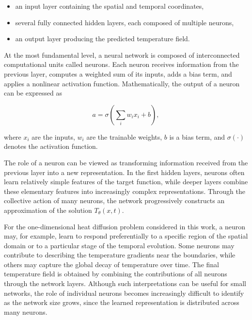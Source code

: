 \begin{itemize}
\item an input layer containing the spatial and temporal coordinates,
\item several fully connected hidden layers, each composed of multiple neurons,
\item an output layer producing the predicted temperature field.
\end{itemize}

At the most fundamental level, a neural network is composed of interconnected computational units called neurons. Each neuron receives information from the previous layer, computes a weighted sum of its inputs, adds a bias term, and applies a nonlinear activation function. Mathematically, the output of a neuron can be expressed as

\begin{equation}
a = \sigma
\left(
\sum_i w_i x_i + b
\right),
\end{equation}

where $x_i$ are the inputs, $w_i$ are the trainable weights, $b$ is a bias term, and $\sigma(\cdot)$ denotes the activation function.

The role of a neuron can be viewed as transforming information received from the previous layer into a new representation. In the first hidden layers, neurons often learn relatively simple features of the target function, while deeper layers combine these elementary features into increasingly complex representations. Through the collective action of many neurons, the network progressively constructs an approximation of the solution $T_{\theta}(x,t)$.

For the one-dimensional heat diffusion problem considered in this work, a neuron may, for example, learn to respond preferentially to a specific region of the spatial domain or to a particular stage of the temporal evolution. Some neurons may contribute to describing the temperature gradients near the boundaries, while others may capture the global decay of temperature over time. The final temperature field is obtained by combining the contributions of all neurons through the network layers. Although such interpretations can be useful for small networks, the role of individual neurons becomes increasingly difficult to identify as the network size grows, since the learned representation is distributed across many neurons.

